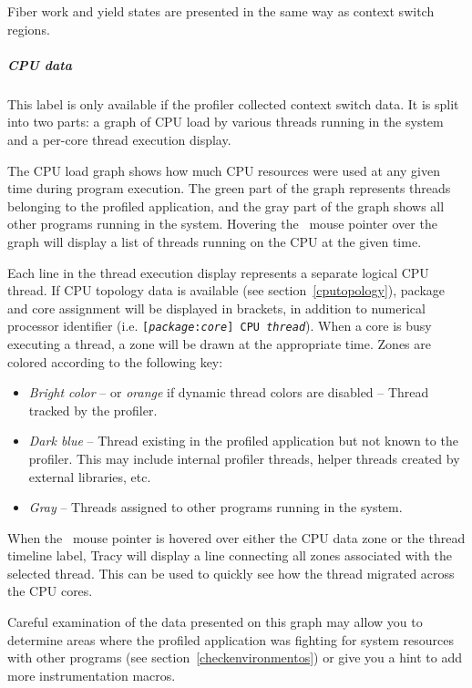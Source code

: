 \documentclass[hidelinks,titlepage,a4paper]{article}
\begin{document}
Fiber work and yield states are presented in the same way as context switch regions.

\subparagraph{CPU data}

This label is only available if the profiler collected context switch data. It is split into two parts: a graph of CPU load by various threads running in the system and a per-core thread execution display.

The CPU load graph shows how much CPU resources were used at any given time during program execution. The green part of the graph represents threads belonging to the profiled application, and the gray part of the graph shows all other programs running in the system. Hovering the \faMousePointer{}~mouse pointer over the graph will display a list of threads running on the CPU at the given time.

Each line in the thread execution display represents a separate logical CPU thread. If CPU topology data is available (see section~\ref{cputopology}), package and core assignment will be displayed in brackets, in addition to numerical processor identifier (i.e. \texttt{[\emph{package}:\emph{core}] CPU \emph{thread}}). When a core is busy executing a thread, a zone will be drawn at the appropriate time. Zones are colored according to the following key:

\begin{itemize}
\item \emph{Bright color} -- or \emph{orange} if dynamic thread colors are disabled -- Thread tracked by the profiler.
\item \emph{Dark blue} -- Thread existing in the profiled application but not known to the profiler. This may include internal profiler threads, helper threads created by external libraries, etc.
\item \emph{Gray} -- Threads assigned to other programs running in the system.
\end{itemize}

When the \faMousePointer{}~mouse pointer is hovered over either the CPU data zone or the thread timeline label, Tracy will display a line connecting all zones associated with the selected thread. This can be used to quickly see how the thread migrated across the CPU cores.

Careful examination of the data presented on this graph may allow you to determine areas where the profiled application was fighting for system resources with other programs (see section~\ref{checkenvironmentos}) or give you a hint to add more instrumentation macros.
\end{document}

